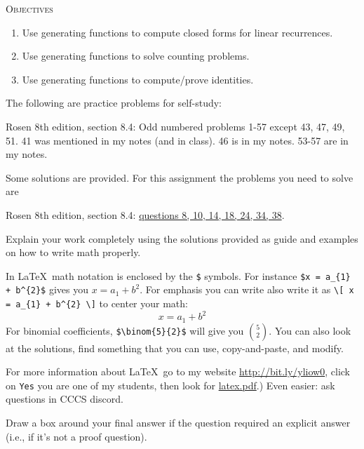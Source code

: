 

\renewcommand\AUTHOR{nweadick1@cougars.ccis.edu} %


\topmattertwo

\textsc{Objectives}
\begin{enumerate}[nosep]
\item Use generating functions to compute closed forms for linear recurrences.
\item Use generating functions to solve counting problems.
\item Use generating functions to compute/prove identities.
\end{enumerate}
\vspace{1cm}



The following are practice problems for self-study:
\begin{enumerate}[nosep]
\li Rosen 8th edition, section 8.4: Odd numbered problems 1-57 except 43,
47, 49, 51.
41 was mentioned in my notes (and in class).
46 is in my notes.
53-57 are in my notes.
\end{enumerate}
Some solutions are provided.
For this assignment the problems you need to solve are
\begin{enumerate}[nosep]
\li Rosen 8th edition, section 8.4:
\underline{questions 8, 10, 14, 18, 24, 34, 38}.
\end{enumerate}
Explain your work completely using the solutions provided as
guide and examples on how to write math properly.

In \LaTeX\, math notation is enclosed by the \verb!$! symbols.
For instance \verb!$x = a_{1} + b^{2}$! gives you $x = a_{1} + b^{2}$.
For emphasis you can write also write it as
\verb!\[ x = a_{1} + b^{2} \]!
to center your math:
\[
x = a_{1} + b^{2}
\]
For binomial coefficients, \verb!$\binom{5}{2}$! will give you 
$\binom{5}{2}$.
You can also look at the solutions, find something that you can use,
copy-and-paste, and modify.

For more information about \LaTeX\, go to my
website
\href{http://bit.ly/yliow0}{http://bit.ly/yliow0},
click on \verb!Yes!
you are one of my students,
then look for
\href{https://drive.google.com/file/d/0BzjYrK0VFuMWZm5xV0kyR3J2Zm8/view?usp=sharing}{latex.pdf}.)
Even easier: ask questions in CCCS discord.





Draw a box around your final answer if the question required
an explicit answer (i.e., if it's not a proof question).

